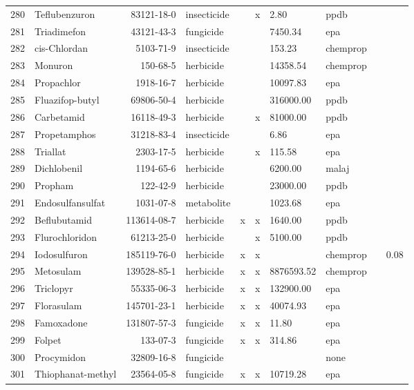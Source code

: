 \begin{longtable}{lp{3cm}rlp{0.5cm}p{0.5cm}p{1cm}p{1cm}p{1cm}p{1cm}}
  280 & Teflubenzuron & 83121-18-0 & insecticide &  & x & 2.80 & ppdb &  &  \\ 
  281 & Triadimefon & 43121-43-3 & fungicide &  &  & 7450.34 & epa &  &  \\ 
  282 & cis-Chlordan & 5103-71-9 & insecticide &  &  & 153.23 & chemprop &  &  \\ 
  283 & Monuron & 150-68-5 & herbicide &  &  & 14358.54 & chemprop &  &  \\ 
  284 & Propachlor & 1918-16-7 & herbicide &  &  & 10097.83 & epa &  &  \\ 
  285 & Fluazifop-butyl & 69806-50-4 & herbicide &  &  & 316000.00 & ppdb &  &  \\ 
  286 & Carbetamid & 16118-49-3 & herbicide &  & x & 81000.00 & ppdb &  &  \\ 
  287 & Propetamphos & 31218-83-4 & insecticide &  &  & 6.86 & epa &  &  \\ 
  288 & Triallat & 2303-17-5 & herbicide &  & x & 115.58 & epa &  &  \\ 
  289 & Dichlobenil & 1194-65-6 & herbicide &  &  & 6200.00 & malaj &  &  \\ 
  290 & Propham & 122-42-9 & herbicide &  &  & 23000.00 & ppdb &  &  \\ 
  291 & Endosulfansulfat & 1031-07-8 & metabolite &  &  & 1023.68 & epa &  &  \\ 
  292 & Beflubutamid & 113614-08-7 & herbicide & x & x & 1640.00 & ppdb &  &  \\ 
  293 & Flurochloridon & 61213-25-0 & herbicide &  & x & 5100.00 & ppdb &  &  \\ 
  294 & Iodosulfuron & 185119-76-0 & herbicide & x & x &  & chemprop &  & 0.08 \\ 
  295 & Metosulam & 139528-85-1 & herbicide & x & x & 8876593.52 & chemprop &  &  \\ 
  296 & Triclopyr & 55335-06-3 & herbicide & x & x & 132900.00 & epa &  &  \\ 
  297 & Florasulam & 145701-23-1 & herbicide & x & x & 40074.93 & epa &  &  \\ 
  298 & Famoxadone & 131807-57-3 & fungicide & x & x & 11.80 & epa &  &  \\ 
  299 & Folpet & 133-07-3 & fungicide & x & x & 314.86 & epa &  &  \\ 
  300 & Procymidon & 32809-16-8 & fungicide &  &  &  & none &  &  \\ 
  301 & Thiophanat-methyl & 23564-05-8 & fungicide & x & x & 10719.28 & epa &  &  \\ 

\end{longtable}
